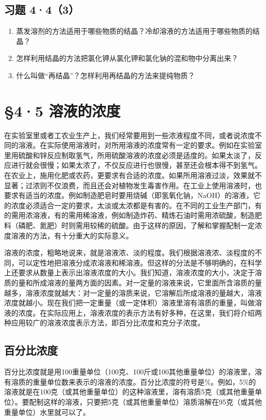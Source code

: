 \subsection{习题 4·4（3）}

\begin{enumerate}
\item
  蒸发溶剂的方法适用于哪些物质的结晶？冷却溶液的方法适用于哪些物质的结晶？
\item
  怎样利用结晶的方法把氯化钾从氯化钾和氯化钠的混和物中分离出来？
\item
  什么叫做``再结晶''？怎样利用再结晶的方法来提纯物质？
\end{enumerate}

\section{§4·5 溶液的浓度}

在实验室里或者工农业生产上，我们经常要用到一些浓液程度不同，或者说浓度不同的溶液。在实际使用溶液时，对所用溶液的浓度常有一定的要求。例如在实验室里用硫酸和锌反应制取氢气，所用硫酸溶液的浓度必须是适度的。如果太淡了，反应进行就会很慢；如果太浓了，不仅反应进行也很慢，甚至还会根本得不到氢气。在农业上，施用化肥或农药，更要求有合适的浓度。如果所用溶液过淡，效果就不显著；过浓则不仅浪费，而且还会对植物发生毒害作用。在工业上使用溶液时，也要求有适当的浓度。例如制造肥皂时要用烧碱（即氢氧化钠，NaOH）的溶液，它的浓度必须适合一定的要求，太淡或太浓都是有害的。在不同的工业生产部门，有的需用浓溶液，有的需用稀溶液，例如制造炸药、精炼石油时需用浓硫酸，制造肥料（磷肥、氮肥）时则需用较稀的硫酸。由于这样的原因，了解和掌握配制一定浓度溶液的方法，有十分重大的实际意义。

溶液的浓度，粗略地说来，就是溶液浓、淡的程度。我们根据溶液浓、淡程度的不同，可以定性地把溶液分成浓溶液和稀溶液。但这样的分法是不够明确的，在科学上还要求从数量上表示出溶液浓度的大小。我们知道，溶液浓度的大小，决定于溶质的量和所成溶液的量两方面的因素。对一定量的溶液来说，它里面所含溶质的量越多，溶液浓度就越大：对一定量的溶质来说，它溶解后所成溶液的量越大，溶液浓度就越小。现在我们把一定重量（或一定体积）溶液里溶有溶质的重量，叫做溶液的浓度。在实际应用上，溶液浓度的表示方法有好多种，在这里，我们将介绍两种应用较广的溶液浓度表示方法，即百分比浓度和克分子浓度。

\subsection{百分比浓度}

百分比浓度就是用100重量单位（100克、100斤或100其他重量单位）的溶液里，溶有溶质的重量单位数来表示的溶液的浓度。百分比浓度的符号是\%。例如，5\%的溶液就是在100克（或其他重量单位）的这种溶液里，溶有溶质5克（或其他重量单位）。要配制这样的溶液，只要把5克（或其他重量单位）溶质溶解在95克（或其他重量单位）水里就可以了。

